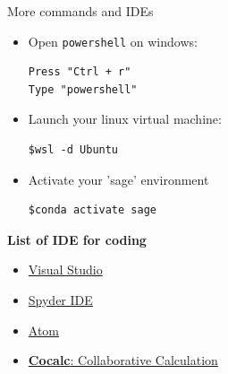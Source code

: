 \documentclass[10pt]{beamer}
\begin{document}
\begin{frame}[fragile]{More commands and IDEs}
\begin{itemize}
\item Open \texttt{powershell} on windows:
\begin{lstlisting}[style=advancedshell]
Press "Ctrl + r" 
Type "powershell"
\end{lstlisting}

\item Launch your linux virtual machine: 
\begin{lstlisting}[style=advancedshell]
$wsl -d Ubuntu
\end{lstlisting}
\item Activate your 'sage' environment 
\begin{lstlisting}[style=advancedshell]
$conda activate sage
\end{lstlisting}
\end{itemize}
\begin{block}{\textbf{List of IDE for coding}}
	\begin{itemize}
		\item \href{https://code.visualstudio.com/}{Visual Studio}
		\item \href{https://www.spyder-ide.org/}{Spyder IDE}
		\item \href{https://atom-editor.cc/}{Atom}
		\item \href{https://cocalc.com/}{\textbf{Cocalc}: Collaborative Calculation}
	\end{itemize}
\end{block}
\end{frame}
\end{document}

